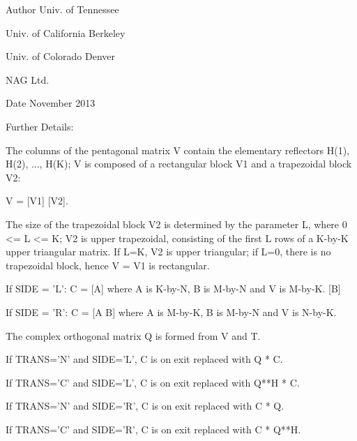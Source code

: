 \begin{DoxyAuthor}{Author}
Univ. of Tennessee 

Univ. of California Berkeley 

Univ. of Colorado Denver 

N\+A\+G Ltd. 
\end{DoxyAuthor}
\begin{DoxyDate}{Date}
November 2013 
\end{DoxyDate}
\begin{DoxyParagraph}{Further Details\+: }
\begin{DoxyVerb}  The columns of the pentagonal matrix V contain the elementary reflectors
  H(1), H(2), ..., H(K); V is composed of a rectangular block V1 and a 
  trapezoidal block V2:

        V = [V1]
            [V2].

  The size of the trapezoidal block V2 is determined by the parameter L, 
  where 0 <= L <= K; V2 is upper trapezoidal, consisting of the first L
  rows of a K-by-K upper triangular matrix.  If L=K, V2 is upper triangular;
  if L=0, there is no trapezoidal block, hence V = V1 is rectangular.

  If SIDE = 'L':  C = [A]  where A is K-by-N,  B is M-by-N and V is M-by-K. 
                      [B]   
  
  If SIDE = 'R':  C = [A B]  where A is M-by-K, B is M-by-N and V is N-by-K.

  The complex orthogonal matrix Q is formed from V and T.

  If TRANS='N' and SIDE='L', C is on exit replaced with Q * C.

  If TRANS='C' and SIDE='L', C is on exit replaced with Q**H * C.

  If TRANS='N' and SIDE='R', C is on exit replaced with C * Q.

  If TRANS='C' and SIDE='R', C is on exit replaced with C * Q**H.\end{DoxyVerb}
 
\end{DoxyParagraph}
